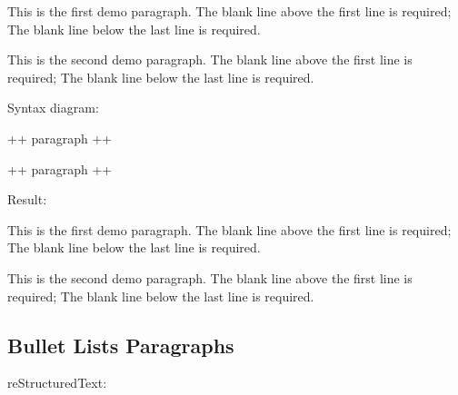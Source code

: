 \documentclass[letterpaper,12pt,english]{sphinxmanual}
\begin{document}
\begin{sphinxVerbatim}[commandchars=\\\{\}]
This is the first demo paragraph. The blank line above
the first line is required; The blank line below the last
line is required.

This is the second demo paragraph. The blank line above
the first line is required; The blank line below the last
line is required.
\end{sphinxVerbatim}

Syntax diagram:

\begin{sphinxVerbatim}[commandchars=\\\{\}]
+\PYGZhy{}\PYGZhy{}\PYGZhy{}\PYGZhy{}\PYGZhy{}\PYGZhy{}\PYGZhy{}\PYGZhy{}\PYGZhy{}\PYGZhy{}\PYGZhy{}\PYGZhy{}\PYGZhy{}\PYGZhy{}\PYGZhy{}\PYGZhy{}\PYGZhy{}\PYGZhy{}\PYGZhy{}\PYGZhy{}\PYGZhy{}\PYGZhy{}\PYGZhy{}\PYGZhy{}\PYGZhy{}\PYGZhy{}\PYGZhy{}\PYGZhy{}\PYGZhy{}\PYGZhy{}+
 paragraph                    \textbar{}
                              \textbar{}
+\PYGZhy{}\PYGZhy{}\PYGZhy{}\PYGZhy{}\PYGZhy{}\PYGZhy{}\PYGZhy{}\PYGZhy{}\PYGZhy{}\PYGZhy{}\PYGZhy{}\PYGZhy{}\PYGZhy{}\PYGZhy{}\PYGZhy{}\PYGZhy{}\PYGZhy{}\PYGZhy{}\PYGZhy{}\PYGZhy{}\PYGZhy{}\PYGZhy{}\PYGZhy{}\PYGZhy{}\PYGZhy{}\PYGZhy{}\PYGZhy{}\PYGZhy{}\PYGZhy{}\PYGZhy{}+

+\PYGZhy{}\PYGZhy{}\PYGZhy{}\PYGZhy{}\PYGZhy{}\PYGZhy{}\PYGZhy{}\PYGZhy{}\PYGZhy{}\PYGZhy{}\PYGZhy{}\PYGZhy{}\PYGZhy{}\PYGZhy{}\PYGZhy{}\PYGZhy{}\PYGZhy{}\PYGZhy{}\PYGZhy{}\PYGZhy{}\PYGZhy{}\PYGZhy{}\PYGZhy{}\PYGZhy{}\PYGZhy{}\PYGZhy{}\PYGZhy{}\PYGZhy{}\PYGZhy{}\PYGZhy{}+
 paragraph                    \textbar{}
                              \textbar{}
+\PYGZhy{}\PYGZhy{}\PYGZhy{}\PYGZhy{}\PYGZhy{}\PYGZhy{}\PYGZhy{}\PYGZhy{}\PYGZhy{}\PYGZhy{}\PYGZhy{}\PYGZhy{}\PYGZhy{}\PYGZhy{}\PYGZhy{}\PYGZhy{}\PYGZhy{}\PYGZhy{}\PYGZhy{}\PYGZhy{}\PYGZhy{}\PYGZhy{}\PYGZhy{}\PYGZhy{}\PYGZhy{}\PYGZhy{}\PYGZhy{}\PYGZhy{}\PYGZhy{}\PYGZhy{}+
\end{sphinxVerbatim}

Result:

This is the first demo paragraph. The blank line above the first
line is required; The blank line below the last line is required.

This is the second demo paragraph. The blank line above the first
line is required; The blank line below the last line is required.


\subsection{Bullet Lists Paragraphs}
\label{\detokenize{rtxt:bullet-lists-paragraphs}}
reStructuredText:
\end{document}
